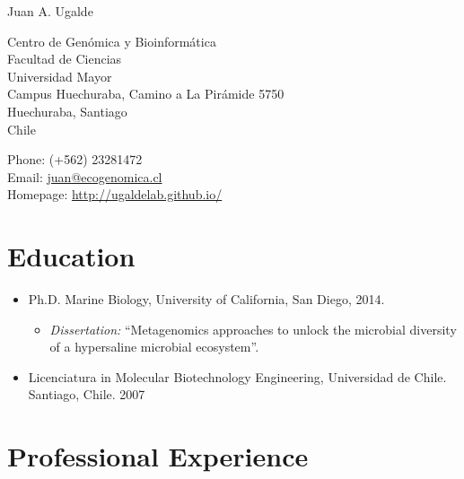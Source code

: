 \documentclass[10pt,letterpaper]{article}
\def\name{Juan A. Ugalde}
\begin{document}
{\huge \name}


\bigskip

\begin{minipage}[t]{0.495\textwidth}
  Centro de Gen\'omica y Bioinform\'atica \\
  Facultad de Ciencias \\
  Universidad Mayor\\
  Campus Huechuraba, Camino a La Pir\'amide 5750 \\
  Huechuraba, Santiago\\
  Chile
\end{minipage}
\begin{minipage}[t]{0.495\textwidth}
  Phone: (+562) 23281472 \\
  Email: \href{mailto:juan@ecogenomica.cl}{juan@ecogenomica.cl} \\
  Homepage: \href{http://ugaldelab.github.io/}{http://ugaldelab.github.io/}
\end{minipage}

\section*{Education}

\begin{itemize}
  \item Ph.D. Marine Biology, University of California, San Diego, 2014.
    \begin{itemize}
    \item \emph{Dissertation:} ``Metagenomics approaches to unlock the microbial diversity of a hypersaline microbial ecosystem''.
    \end{itemize}

  \item Licenciatura in Molecular Biotechnology Engineering, Universidad de Chile. Santiago, Chile. 2007

\end{itemize}

\section*{Professional Experience}
\end{document}
